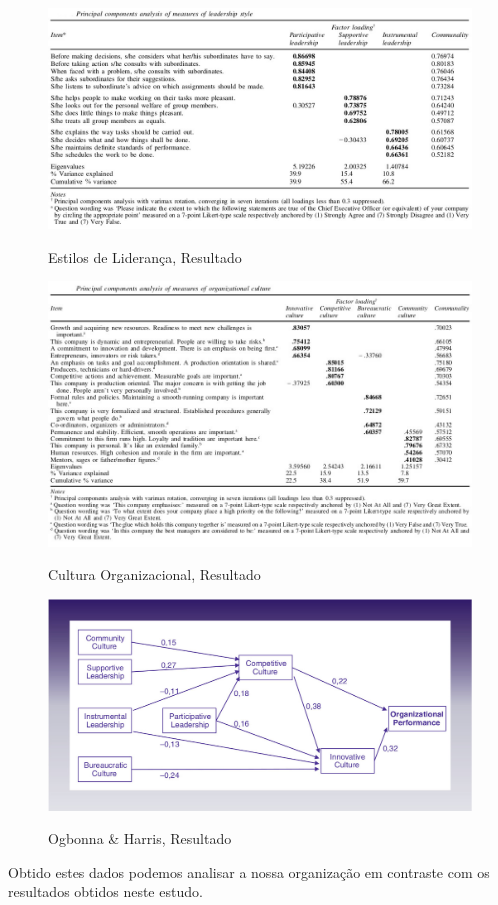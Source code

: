 \newpage
\begin{figure}[H]
\centering
\includegraphics[scale=.5]{"./image/OB/Leadership.jpg"}\\
\caption{Estilos de Liderança, Resultado}
\label{grafico 1}
\end{figure}\par

\begin{figure}[H]
\centering
\includegraphics[scale=.6]{"./image/OB/Culture.jpg"}\\
\caption{Cultura Organizacional, Resultado}
\label{grafico 1}
\end{figure}\par

\newpage
\begin{figure}[H]
\centering
\includegraphics[scale=.4]{"./image/OB/Ogbonna & Harris.jpg"}\\
\caption{Ogbonna \& Harris, Resultado}
\label{grafico 1}
\end{figure}\par
Obtido estes dados podemos analisar a nossa organização em contraste com os resultados obtidos neste estudo.\\


